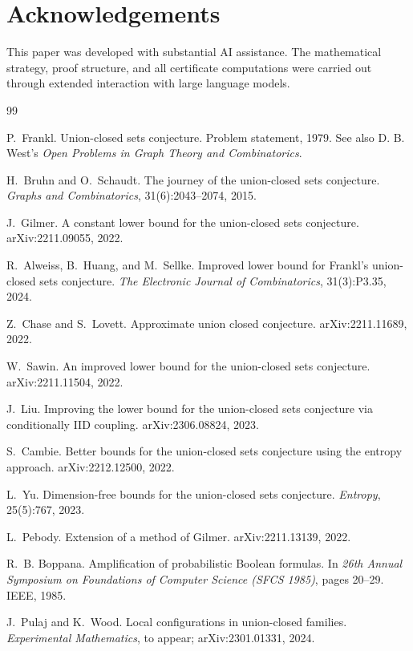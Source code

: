 \section*{Acknowledgements}
This paper was developed with substantial AI assistance.
The mathematical strategy, proof structure, and all
certificate computations were carried out through
extended interaction with large language models.

\begin{thebibliography}{99}

P.~Frankl.
\newblock Union-closed sets conjecture.
\newblock Problem statement, 1979. See also D. B. West's \emph{Open Problems in Graph Theory and Combinatorics}.

H.~Bruhn and O.~Schaudt.
\newblock The journey of the union-closed sets conjecture.
\newblock \emph{Graphs and Combinatorics}, 31(6):2043--2074, 2015.

J.~Gilmer.
\newblock A constant lower bound for the union-closed sets conjecture.
\newblock arXiv:2211.09055, 2022.

R.~Alweiss, B.~Huang, and M.~Sellke.
\newblock Improved lower bound for Frankl's union-closed sets conjecture.
\newblock \emph{The Electronic Journal of Combinatorics}, 31(3):P3.35, 2024.

Z.~Chase and S.~Lovett.
\newblock Approximate union closed conjecture.
\newblock arXiv:2211.11689, 2022.

W.~Sawin.
\newblock An improved lower bound for the union-closed sets conjecture.
\newblock arXiv:2211.11504, 2022.

J.~Liu.
\newblock Improving the lower bound for the union-closed sets conjecture via conditionally {IID} coupling.
\newblock arXiv:2306.08824, 2023.

S.~Cambie.
\newblock Better bounds for the union-closed sets conjecture using the entropy approach.
\newblock arXiv:2212.12500, 2022.

L.~Yu.
\newblock Dimension-free bounds for the union-closed sets conjecture.
\newblock \emph{Entropy}, 25(5):767, 2023.


L.~Pebody.
\newblock Extension of a method of Gilmer.
\newblock arXiv:2211.13139, 2022.

R.~B. Boppana.
\newblock Amplification of probabilistic Boolean formulas.
\newblock In \emph{26th Annual Symposium on Foundations of Computer Science (SFCS 1985)}, pages 20--29. IEEE, 1985.

J.~Pulaj and K.~Wood.
\newblock Local configurations in union-closed families.
\newblock \emph{Experimental Mathematics}, to appear; arXiv:2301.01331, 2024.

\end{thebibliography}



